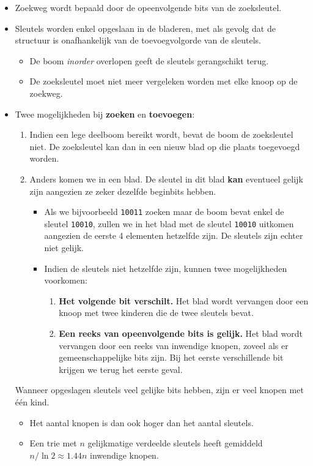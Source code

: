 \begin{itemize}
    \item Zoekweg wordt bepaald door de opeenvolgende bits van de zoeksleutel.
    \item Sleutels worden enkel opgeslaan in de bladeren, met als gevolg dat de structuur is onafhankelijk van de toevoegvolgorde van de sleutels.
    \begin{itemize}
        \item  De boom \textit{inorder} overlopen geeft de sleutels gerangschikt terug.
        \item  De zoeksleutel moet niet meer vergeleken worden met elke knoop op de zoekweg. 
    \end{itemize}
    \item Twee mogelijkheden bij \textbf{zoeken} en \textbf{toevoegen}:
    \begin{enumerate}
        \item Indien een lege deelboom bereikt wordt, bevat de boom de zoeksleutel niet. De zoeksleutel kan dan in een nieuw blad op die plaats toegevoegd worden.
        \item Anders komen we in een blad. De sleutel in dit blad \textbf{kan} eventueel gelijk zijn aangezien ze zeker dezelfde beginbits hebben.  

        \begin{itemize}
            \item Als we bijvoorbeeld \texttt{10011} zoeken maar de boom bevat enkel de sleutel \texttt{10010}, zullen we in het blad met de sleutel \texttt{10010} uitkomen aangezien de eerste 4 elementen hetzelfde zijn. De sleutels zijn echter niet gelijk.
            \item Indien de sleutels niet hetzelfde zijn, kunnen twee mogelijkheden voorkomen:
            \begin{enumerate}
                \item \textbf{Het volgende bit verschilt.} Het blad wordt vervangen door een knoop met twee kinderen die de twee sleutels bevat.
                \item \textbf{Een reeks van opeenvolgende bits is gelijk.} Het blad wordt vervangen door een reeks van inwendige knopen, zoveel als er gemeenschappelijke bits zijn. Bij het eerste verschillende bit krijgen we terug het eerste geval.
            \end{enumerate}
        \end{itemize}
    \end{enumerate}
    \alert Wanneer opgeslagen sleutels veel gelijke bits hebben, zijn er veel knopen met één kind.
    \begin{itemize}
        \item Het aantal knopen is dan ook hoger dan het aantal sleutels.
        \item Een trie met $n$ gelijkmatige verdeelde sleutels heeft gemiddeld $n/\ln 2 \approx 1.44n$ inwendige knopen.
    \end{itemize}

\end{itemize}


